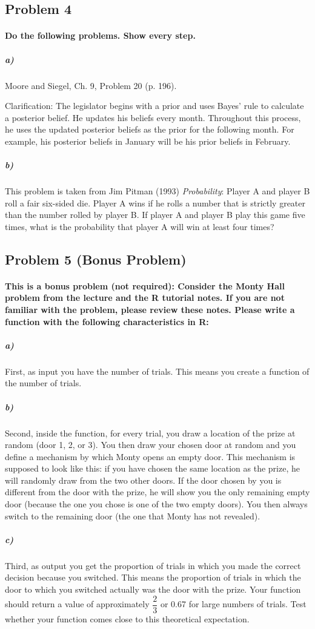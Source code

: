 \documentclass[12pt,letter]{article}
\begin{document}
\subsection*{Problem 4}

\paragraph{Do the following problems. Show every step.}

\subparagraph{a)} Moore and Siegel, Ch. 9, Problem 20 (p. 196).

Clarification: The legislator begins with a prior and uses Bayes' rule to calculate a posterior belief. He updates his beliefs every month. Throughout this process, he uses the updated posterior beliefs as the prior for the following month. For example, his posterior beliefs in January will be his prior beliefs in February.

\subparagraph{b)} This problem is taken from Jim Pitman (1993) \textit{Probability}: Player A and player B roll a fair six-sided die. Player A wins if he rolls a number that is strictly greater than the number rolled by player B. If player A and player B play this game five times, what is the probability that player A will win at least four times? %



\subsection*{Problem 5 (Bonus Problem)}

\paragraph{This is a bonus problem (not required): Consider the Monty Hall problem from the lecture and the R tutorial notes. If you are not familiar with the problem, please review these notes. Please write a function with the following characteristics in R:}

\subparagraph{a)} First, as input you have the number of trials. This means you create a function of the number of trials.

\subparagraph{b)} Second, inside the function, for every trial, you draw a location of the prize at random (door 1, 2, or 3). You then draw your chosen door at random and you define a mechanism by which Monty opens an empty door. This mechanism is supposed to look like this: if you have chosen the same location as the prize, he will randomly draw from the two other doors. If the door chosen by you is different from the door with the prize, he will show you the only remaining empty door (because the one you chose is one of the two empty doors). You then always switch to the remaining door (the one that Monty has not revealed).

\subparagraph{c)} Third, as output you get the proportion of trials in which you made the correct decision because you switched. This means the proportion of trials in which the door to which you switched actually was the door with the prize. Your function should return a value of approximately $\dfrac{2}{3}$ or 0.67 for large numbers of trials. Test whether your function comes close to this theoretical expectation.
\end{document}
